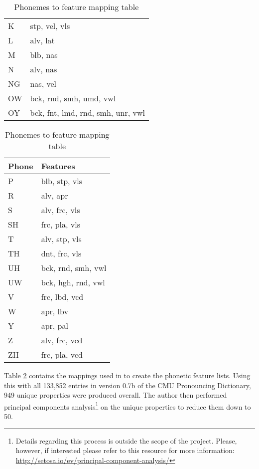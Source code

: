 \begin{table}[!htb]
\begin{minipage}{.33\linewidth}
\begin{tabular}{ll}
            K &  stp, vel, vls \\
            L &  alv, lat \\
            M &  blb, nas \\
            N &  alv, nas \\
            NG & nas, vel \\
            OW & bck, rnd, smh, umd, vwl \\
            OY & bck, fnt, lmd, rnd, smh, unr, vwl
        \end{tabular}
    \end{minipage} 
    \begin{minipage}{.33\linewidth}
        \centering
        \begin{tabular}{ll}
            Phone & Features \\
            \hline
            P & blb, stp, vls \\
            R & alv, apr \\
            S & alv, frc, vls \\
            SH & frc, pla, vls \\
            T & alv, stp, vls \\
            TH & dnt, frc, vls \\
            UH & bck, rnd, smh, vwl \\
            UW & bck, hgh, rnd, vwl \\
            V & frc, lbd, vcd \\
            W & apr, lbv \\
            Y & apr, pal \\
            Z & alv, frc, vcd \\
            ZH & frc, pla, vcd \\
        \end{tabular}
    \end{minipage} 
    \caption{Phonemes to feature mapping table}
    \label{tab:features}
\end{table}

Table \ref{tab:features} contains the mappings used in \cite{parrish2017poetic} to create the phonetic feature lists.
Using this with all 133,852 entries in version 0.7b of the CMU Pronouncing Dictionary, 949 unique properties were produced overall. The author then performed principal components analysis\footnote{Details regarding this process is outside the scope of the project. Please, however, if interested please refer to this resource for more information: \url{http://setosa.io/ev/principal-component-analysis/}} on the unique properties to reduce them down to 50.


